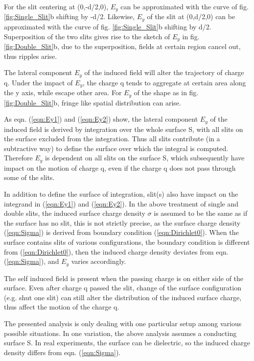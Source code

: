 \documentclass[prd,showpacs,twocolumn]{revtex4-1}
\begin{document}
For the slit centering at (0,-d/2,0), $E_y$ can be approximated with the curve of fig. \ref{fig:Single_Slit}b shifting by -d/2. Likewise, $E_y$ of the slit at (0,d/2,0) can be approximated with the curve of fig. \ref{fig:Single_Slit}b shifting by d/2. Superposition of the two slits gives rise to the sketch of $E_y$ in fig. \ref{fig:Double_Slit}b, due to the superposition, fields at certain region cancel out, thus ripples arise.

The lateral component $E_y$ of the induced field will alter the trajectory of charge q. Under the impact of $E_y$, the charge q tends to aggregate at certain area along the y axis, while escape other area. For $E_y$ of the shape as in fig. \ref{fig:Double_Slit}b, fringe like spatial distribution can arise.

As eqn. (\ref{eqn:Ey1}) and (\ref{eqn:Ey2}) show, the lateral component $E_y$ of the induced field is derived by integration over the whole surface S, with all slits on the surface excluded from the integration. Thus all slits contribute (in a subtractive way) to define the surface over which the integral is computed. Therefore $E_y$ is dependent on all slits on the surface S, which subsequently have impact on the motion of charge q, even if the charge q does not pass through some of the slits. 

In addition to define the surface of integration, slit(s) also have impact on the integrand in (\ref{eqn:Ey1}) and (\ref{eqn:Ey2}). In the above treatment of single and double slits, the induced surface charge density $\sigma$ is assumed to be the same as if the surface has no slit, this is not strictly precise, as the surface charge density (\ref{eqn:Sigma}) is derived from boundary condition (\ref{eqn:Dirichlet0}). When the surface contains slits of various configurations, the boundary condition is different from (\ref{eqn:Dirichlet0}), then the induced charge density deviates from eqn. (\ref{eqn:Sigma}), and $E_y$ varies accordingly.

The self induced field is present when the passing charge is on either side of the surface. Even after charge q passed the slit, change of the surface configuration (e.g. shut one slit) can still alter the distribution of the induced surface charge, thus affect the motion of the charge q.

The presented analysis is only dealing with one particular setup among various possible situations. In one variation, the above analysis assumes a conducting surface S. In real experiments, the surface can be dielectric, so the induced charge density differs from eqn. (\ref{eqn:Sigma}).
\end{document}
